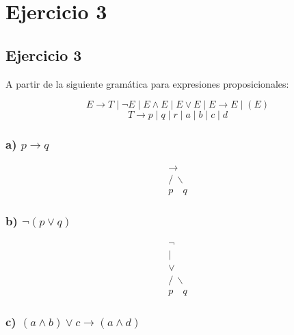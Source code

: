 \chapter*{Ejercicio 3}
\section*{Ejercicio 3}

A partir de la siguiente gramática para expresiones proposicionales:

\[
E \to T \mid \neg E \mid E \land E \mid E \lor E \mid E \to E \mid (E)
\]
\[
T \to p \mid q \mid r \mid a \mid b \mid c \mid d
\]

\subsection*{a) $p \to q$}

\vspace*{\fill}
\begin{center}
\[
\begin{array}{c}
     \rightarrow \\
    / \ \backslash \\
   p   \quad  q 
\end{array}
\]
\end{center}
\vspace*{\fill}

\subsection*{b) $\neg(p \lor q)$}

\vspace*{\fill}
\begin{center}
\[
\begin{array}{c}
      \neg \\
      | \\
      \lor \\
     / \ \backslash \\
    p   \quad  q 
\end{array}
\]
\end{center}
\vspace*{\fill}

\subsection*{c) $(a \land b) \lor c \to (a \land d)$}

